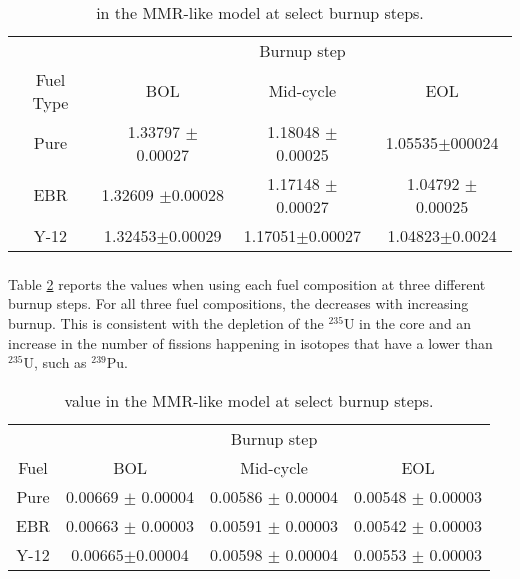 \subsubsection{\keff}

\begin{table}
        \centering
        \caption{\keff in the \gls{MMR}-like model at select burnup 
        steps.}
        \label{tab:mmr_keff}
        \begin{tabular}{c c c c}
                \hline 
                & \multicolumn{3}{c}{Burnup step}\\
                Fuel Type & \gls{BOL} & Mid-cycle & \gls{EOL} \\
                \hline 
                Pure & 1.33797 $\pm$ 0.00027 & 1.18048 $\pm$ 0.00025 & 1.05535$\pm$000024\\
                \gls{EBR} & 1.32609 $\pm$0.00028 & 1.17148 $\pm$ 0.00027 & 1.04792 $\pm$ 0.00025 \\
                Y-12 & 1.32453$\pm$0.00029 & 1.17051$\pm$0.00027 & 1.04823$\pm$0.0024\\
                \hline
                
        \end{tabular}
\end{table}

\subsubsection{\betaEff}

Table \ref{tab:mmr_betaeff} reports the \betaEff values when using 
each fuel composition at three different burnup steps. For all three 
fuel compositions, the \betaEff decreases with increasing burnup. This 
is consistent with the depletion of the $^{235}$U in the core and 
an increase in the number of fissions happening in isotopes
that have a lower \betaEff than $^{235}$U, such as $^{239}$Pu. 

\begin{table}
        \centering
        \caption{\betaEff value in the \gls{MMR}-like model at 
        select burnup steps.}
        \label{tab:mmr_betaeff}
        \begin{tabular}{c c c c}
                \hline 
                 & \multicolumn{3}{c}{Burnup step}\\
                Fuel & \gls{BOL} & Mid-cycle & \gls{EOL}\\
                \hline 
                Pure & 0.00669 $\pm$ 0.00004 & 0.00586 $\pm$ 0.00004 & 0.00548 $\pm$ 0.00003\\
                \gls{EBR} & 0.00663 $\pm$ 0.00003 & 0.00591 $\pm$ 0.00003 & 0.00542 $\pm$ 0.00003\\
                Y-12 & 0.00665$\pm$0.00004 &  0.00598 $\pm$ 0.00004& 0.00553 $\pm$ 0.00003\\
                \hline 

        \end{tabular}
\end{table}

